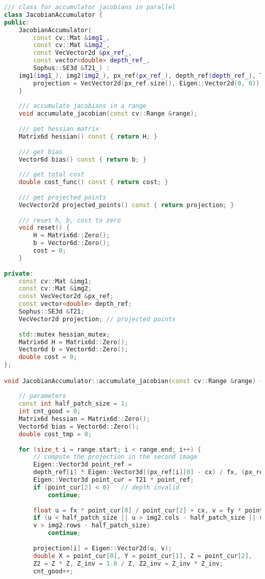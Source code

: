 \begin{lstlisting}[language=c++,caption=slambook2/ch8/direct_method.cpp (part)]
/// class for accumulator jacobians in parallel
class JacobianAccumulator {
public:
	JacobianAccumulator(
		const cv::Mat &img1_,
		const cv::Mat &img2_,
		const VecVector2d &px_ref_,
		const vector<double> depth_ref_,
		Sophus::SE3d &T21_) :
	img1(img1_), img2(img2_), px_ref(px_ref_), depth_ref(depth_ref_), T21(T21_) {
		projection = VecVector2d(px_ref.size(), Eigen::Vector2d(0, 0));
	}
	
	/// accumulate jacobians in a range
	void accumulate_jacobian(const cv::Range &range);
	
	/// get hessian matrix
	Matrix6d hessian() const { return H; }
	
	/// get bias
	Vector6d bias() const { return b; }
	
	/// get total cost
	double cost_func() const { return cost; }
	
	/// get projected points
	VecVector2d projected_points() const { return projection; }
	
	/// reset h, b, cost to zero
	void reset() {
		H = Matrix6d::Zero();
		b = Vector6d::Zero();
		cost = 0;
	}
	
private:
	const cv::Mat &img1;
	const cv::Mat &img2;
	const VecVector2d &px_ref;
	const vector<double> depth_ref;
	Sophus::SE3d &T21;
	VecVector2d projection; // projected points
	
	std::mutex hessian_mutex;
	Matrix6d H = Matrix6d::Zero();
	Vector6d b = Vector6d::Zero();
	double cost = 0;
};

void JacobianAccumulator::accumulate_jacobian(const cv::Range &range) {
	
	// parameters
	const int half_patch_size = 1;
	int cnt_good = 0;
	Matrix6d hessian = Matrix6d::Zero();
	Vector6d bias = Vector6d::Zero();
	double cost_tmp = 0;
	
	for (size_t i = range.start; i < range.end; i++) {
		// compute the projection in the second image
		Eigen::Vector3d point_ref =
		depth_ref[i] * Eigen::Vector3d((px_ref[i][0] - cx) / fx, (px_ref[i][1] - cy) / fy, 1);
		Eigen::Vector3d point_cur = T21 * point_ref;
		if (point_cur[2] < 0)   // depth invalid
			continue;
		
		float u = fx * point_cur[0] / point_cur[2] + cx, v = fy * point_cur[1] / point_cur[2] + cy;
		if (u < half_patch_size || u > img2.cols - half_patch_size || v < half_patch_size ||
		v > img2.rows - half_patch_size)
			continue;
		
		projection[i] = Eigen::Vector2d(u, v);
		double X = point_cur[0], Y = point_cur[1], Z = point_cur[2],
		Z2 = Z * Z, Z_inv = 1.0 / Z, Z2_inv = Z_inv * Z_inv;
		cnt_good++;
		

\end{lstlisting}
